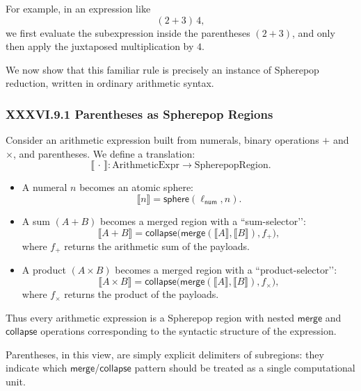 \documentclass[11pt,letterpaper]{article}
\begin{document}
For example, in an expression like
\[
(2 + 3)\,4,
\]
we first evaluate the subexpression inside the parentheses $(2+3)$, and only
then apply the juxtaposed multiplication by $4$.

We now show that this familiar rule is precisely an instance of Spherepop
reduction, written in ordinary arithmetic syntax.

\subsubsection*{XXXVI.9.1 Parentheses as Spherepop Regions}

Consider an arithmetic expression built from numerals, binary operations
$+$ and $\times$, and parentheses. We define a translation:
\[
\llbracket \,\cdot\, \rrbracket : \text{ArithmeticExpr} \to \text{SpherepopRegion}.
\]

\begin{itemize}
  \item A numeral $n$ becomes an atomic sphere:
    \[
    \llbracket n \rrbracket = \mathsf{sphere}(\ell_{\mathsf{num}}, n).
    \]
  \item A sum $(A + B)$ becomes a merged region with a ``sum-selector’’:
    \[
    \llbracket A + B \rrbracket 
    = \mathsf{collapse}\big(
        \mathsf{merge}(\llbracket A \rrbracket, \llbracket B \rrbracket),
        f_{+}
      \big),
    \]
    where $f_{+}$ returns the arithmetic sum of the payloads.
  \item A product $(A \times B)$ becomes a merged region with a
        ``product-selector’’:
    \[
    \llbracket A \times B \rrbracket 
    = \mathsf{collapse}\big(
        \mathsf{merge}(\llbracket A \rrbracket, \llbracket B \rrbracket),
        f_{\times}
      \big),
    \]
    where $f_{\times}$ returns the product of the payloads.
\end{itemize}

Thus every arithmetic expression is a Spherepop region with nested
$\mathsf{merge}$ and $\mathsf{collapse}$ operations corresponding to the syntactic
structure of the expression.

Parentheses, in this view, are simply explicit delimiters of subregions:
they indicate which $\mathsf{merge}$/$\mathsf{collapse}$ pattern should be treated as a 
single computational unit.

\end{document}
